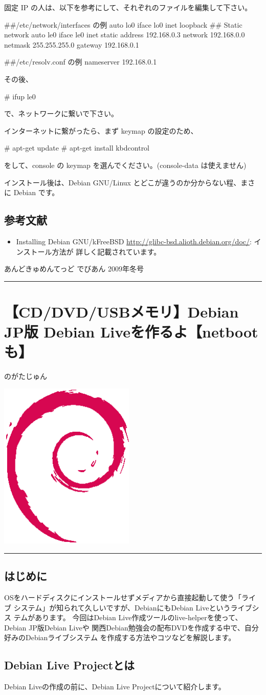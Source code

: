 \documentclass[mingoth,a4paper]{jsarticle}
\renewcommand{\dancersection}[2]{%
\newpage
あんどきゅめんてっど でびあん 2009年冬号
%
\vspace{0.1mm}\\
{\color{dancerlightblue}\rule{\hsize}{2mm}}

%
%
\begin{minipage}[t]{0.6\hsize}
\color{dancerdarkblue}
\vspace{1cm}
\section{#1}
\hfill{}#2\\
\end{minipage}
\begin{minipage}[t]{0.4\hsize}
\vspace{-2cm}
\hfill{}\includegraphics[height=8cm]{image200502/openlogo-nd.eps}\\
\vspace{-5cm}
\end{minipage}
%
%
{\color{dancerdarkblue}\rule{0.74\hsize}{2mm}}
%
\vspace{2cm}
}
\begin{document}
固定 IP の人は、以下を参考にして、それぞれのファイルを編集して下さい。
\begin{commandline}
##/etc/network/interfaces の例
auto lo0
iface lo0 inet loopback
## Static network
auto le0
iface le0 inet static
    address 192.168.0.3
    network 192.168.0.0
    netmask 255.255.255.0
    gateway 192.168.0.1
\end{commandline}
\begin{commandline}
##/etc/resolv.conf の例
nameserver 192.168.0.1
\end{commandline}
その後、
\begin{commandline}
# ifup le0
\end{commandline}
で、ネットワークに繋いで下さい。

インターネットに繋がったら、まず keymap の設定のため、
\begin{commandline}
# apt-get update
# apt-get install kbdcontrol
\end{commandline}
をして、console の keymap を選んでください。(console-data は使えません)

インストール後は、Debian GNU/Linux とどこが違うのか分からない程、まさに Debian です。

\subsection{参考文献}

\begin{itemize}
 \item Installing Debian GNU/kFreeBSD
       \url{http://glibc-bsd.alioth.debian.org/doc/}: インストール方法が
       詳しく記載されています。
\end{itemize}

\dancersection{【CD/DVD/USBメモリ】Debian JP版 Debian Liveを作るよ【netbootも】}{のがたじゅん}

\subsection{はじめに}
OSをハードディスクにインストールせずメディアから直接起動して使う「ライブ
システム」が知られて久しいですが、DebianにもDebian Liveというライブシス
テムがあります。
今回はDebian Live作成ツールのlive-helperを使って、Debian JP版Debian Liveや
関西Debian勉強会の配布DVDを作成する中で、自分好みのDebianライブシステム
を作成する方法やコツなどを解説します。

\subsection{Debian Live Projectとは}
Debian Liveの作成の前に、Debian Live Projectについて紹介します。
\end{document}
